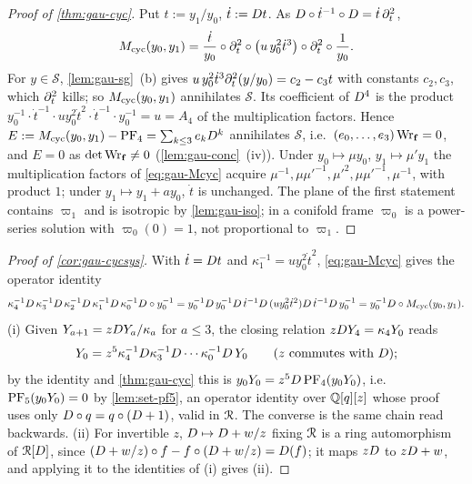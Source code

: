 \begin{proof}[Proof of \cref{thm:gau-cyc}]
Put $t:=y_1/y_0$, $\dot t:=D t$. As $D\circ\dot t^{-1}\circ D=\dot t\,\partial_t^2$,
\[
M_{\mathrm{cyc}}(y_0,y_1)=\frac{\dot t}{y_0}\circ\partial_t^2\circ\bigl(u\,y_0^2\dot t^3\bigr)\circ\partial_t^2\circ\frac1{y_0}.
\]
For $y\in\mathcal S$, \cref{lem:gau-sg}~(b) gives $u\,y_0^2\dot t^3\partial_t^2(y/y_0)=c_2-c_3t$ with constants $c_2,c_3$, which $\partial_t^2$ kills; so $M_{\mathrm{cyc}}(y_0,y_1)$ annihilates $\mathcal S$. Its coefficient of $D^4$ is the product $y_0^{-1}\cdot\dot t^{-1}\cdot uy_0^2\dot t^2\cdot\dot t^{-1}\cdot y_0^{-1}=u=A_4$ of the multiplication factors. Hence $E:=M_{\mathrm{cyc}}(y_0,y_1)-\mathrm{PF}_{4}=\sum_{k\leq3}e_kD^k$ annihilates $\mathcal S$, i.e.\ $(e_0,\dots,e_3)\operatorname{Wr}_{\mathbf f}=0$, and $E=0$ as $\det\operatorname{Wr}_{\mathbf f}\neq0$ (\cref{lem:gau-conc}~(iv)). Under $y_0\mapsto\mu y_0$, $y_1\mapsto\mu'y_1$ the multiplication factors of \eqref{eq:gau-Mcyc} acquire $\mu^{-1},\mu\mu'^{-1},\mu'^2,\mu\mu'^{-1},\mu^{-1}$, with product $1$; under $y_1\mapsto y_1+ay_0$, $\dot t$ is unchanged. The plane of the first statement contains $\varpi_1$ and is isotropic by \cref{lem:gau-iso}; in a conifold frame $\varpi_0$ is a power-series solution with $\varpi_0(0)=1$, not proportional to $\varpi_1$.
\end{proof}

\begin{proof}[Proof of \cref{cor:gau-cycsys}]
With $\dot t=D t$ and $\kappa_1^{-1}=uy_0^2\dot t^2$, \eqref{eq:gau-Mcyc} gives the operator identity
\[
\kappa_4^{-1}D\,\kappa_3^{-1}D\,\kappa_2^{-1}D\,\kappa_1^{-1}D\,\kappa_0^{-1}D\circ y_0^{-1}=y_0^{-1}D\,y_0^{-1}D\,\dot t^{-1}D\,(uy_0^2\dot t^2)D\,\dot t^{-1}D\,y_0^{-1}=y_0^{-1}D\circ M_{\mathrm{cyc}}(y_0,y_1).
\]
(i) Given $Y_{a+1}=zD Y_a/\kappa_a$ for $a\leq3$, the closing relation $zD Y_4=\kappa_4Y_0$ reads
\[
Y_0=z^5\kappa_4^{-1}D\kappa_3^{-1}D\cdots\kappa_0^{-1}D\,Y_0\qquad(\text{$z$ commutes with $D$});
\]
by the identity and \cref{thm:gau-cyc} this is $y_0Y_0=z^5D\,\mathrm{PF}_{4}(y_0Y_0)$, i.e.\ $\mathrm{PF}_{5}(y_0Y_0)=0$ by \cref{lem:set-pf5}, an operator identity over $\mathbb{Q}[q][z]$ whose proof uses only $D\circ q=q\circ(D+1)$, valid in $\mathcal{R}$. The converse is the same chain read backwards. (ii) For invertible $z$, $D\mapsto D+w/z$ fixing $\mathcal{R}$ is a ring automorphism of $\mathcal{R}[D]$, since $(D+w/z)\circ f-f\circ(D+w/z)=D(f)$; it maps $zD$ to $zD+w$, and applying it to the identities of (i) gives (ii).
\end{proof}

